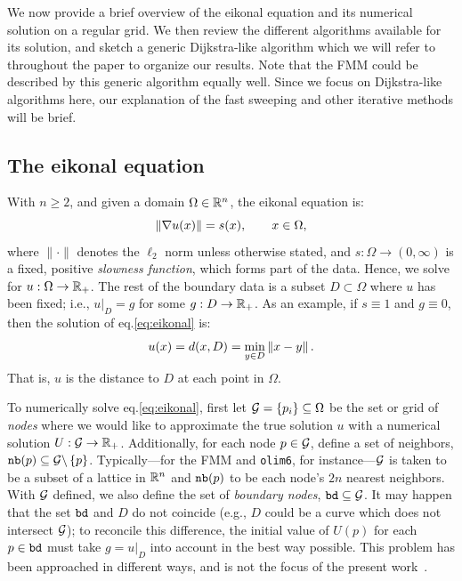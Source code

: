 \documentclass[smallcondensed]{svjour3}
\begin{document}
We now provide a brief overview of the eikonal equation and its
numerical solution on a regular grid. We then review the different
algorithms available for its solution, and sketch a generic
Dijkstra-like algorithm which we will refer to throughout the paper to
organize our results. Note that the FMM could be described by this
generic algorithm equally well. Since we focus on Dijkstra-like
algorithms here, our explanation of the fast sweeping and other
iterative methods will be brief.

\subsection{The eikonal equation}

With $n \geq 2$, and given a domain $\Omega \in \mathbb{R}^n$, the eikonal
equation is:
\begin{equation}\label{eq:eikonal}
  \left\|\nabla u(x)\right\| = s(x), \qquad x \in \Omega,
\end{equation}
where $\|\cdot\|$ denotes the $\ell_2$ norm unless otherwise stated,
and $s : \Omega \to (0, \infty)$ is a fixed, positive \emph{slowness
  function}, which forms part of the data. Hence, we solve for
$u : \Omega \to \mathbb{R}_+$. The rest of the boundary data is a subset
$D \subset \Omega$ where $u$ has been fixed; i.e.,
$\left. u \right|_D = g$ for some $g : D \to \mathbb{R}_+$. As an example, if
$s \equiv 1$ and $g \equiv 0$, then the solution of eq.\@ \ref{eq:eikonal} is:
\begin{equation}
  \label{eq:distance-to-Omega}
  u(x) = d(x, D) = \min_{y \in D} \left\|x - y\right\|.
\end{equation}
That is, $u$ is the distance to $D$ at each point in
$\Omega$.

To numerically solve eq.\@ \ref{eq:eikonal}, first let
$\mathcal{G} = \{p_i\} \subseteq \Omega$ be the set or grid of \emph{nodes}
where we would like to approximate the true solution $u$ with a
numerical solution $U : \mathcal{G} \to \mathbb{R}_+$. Additionally, for each node
$p \in \mathcal{G}$, define a set of neighbors,
$\texttt{nb}(p) \subseteq \mathcal{G} \backslash \left\{p\right\}$. Typically---for the FMM
and \texttt{olim6}, for instance---$\mathcal{G}$ is taken to be a subset of
a lattice in $\mathbb{R}^n$ and $\texttt{nb}(p)$ to be each node's $2n$ nearest
neighbors. With $\mathcal{G}$ defined, we also define the set of
\emph{boundary nodes}, $\texttt{bd} \subseteq \mathcal{G}$. It may happen that
the set $\texttt{bd}$ and $D$ do not coincide (e.g., $D$ could be a
curve which does not intersect $\mathcal{G}$); to reconcile this difference,
the initial value of $U(p)$ for each $p \in \texttt{bd}$ must take
$g = \left. u \right|_D$ into account in the best way possible. This
problem has been approached in different ways, and is not the focus of
the present work~\cite{chopp2001some}.
\end{document}
